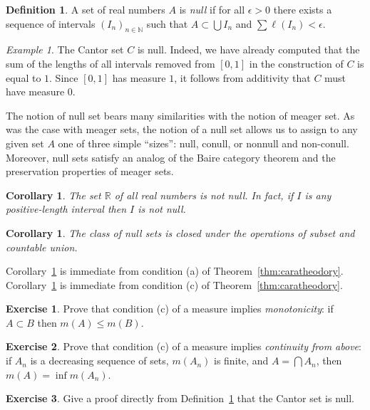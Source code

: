 \documentclass[11pt,oneside]{amsbook}
\newcommand{\NN}{\mathbb N}
\newcommand{\RR}{\mathbb R}
\theoremstyle{definition}
\newtheorem{exerc}{Exercise}[section]
\theoremstyle{plain}
\newtheorem{cor}[thm]{Corollary}
\theoremstyle{definition}
\newtheorem{defn}[thm]{Definition}
\theoremstyle{remark}
\newtheorem{example}[thm]{Example}
\numberwithin{equation}{section}
\numberwithin{figure}{section}
\begin{document}
\begin{defn}
  \label{defn:null}
  A set of real numbers $A$ is \emph{null} if for all $\epsilon>0$ there exists a sequence of intervals $(I_n)_{n\in\NN}$ such that $A\subset\bigcup I_n$ and $\sum\ell(I_n)<\epsilon$.
\end{defn}

\begin{example}
  The Cantor set $C$ is null. Indeed, we have already computed that the sum of the lengths of all intervals removed from $[0,1]$ in the construction of $C$ is equal to $1$. Since $[0,1]$ has measure $1$, it follows from additivity that $C$ must have measure $0$.
\end{example}

The notion of null set bears many similarities with the notion of meager set. As was the case with meager sets, the notion of a null set allows us to assign to any given set $A$ one of three simple ``sizes'': null, conull, or nonnull and non-conull. Moreover, null sets satisfy an analog of the Baire category theorem and the preservation properties of meager sets.

\begin{cor}
  \label{cor:interval-nonnull}
  The set $\RR$ of all real numbers is not null. In fact, if $I$ is any positive-length interval then $I$ is not null.
\end{cor}

\begin{cor}
  \label{cor:null-pres}
  The class of null sets is closed under the operations of subset and countable union.
\end{cor}

Corollary~\ref{cor:interval-nonnull} is immediate from condition (a) of Theorem~\ref{thm:caratheodory}. Corollary~\ref{cor:null-pres} is immediate from condition (c) of Theorem~\ref{thm:caratheodory}.

\begin{exerc}
  Prove that condition (c) of a measure implies \emph{monotonicity}: if $A\subset B$ then $m(A)\leq m(B)$.
\end{exerc}

\begin{exerc}
  \label{exerc:continuity-above}
  Prove that condition (c) of a measure implies \emph{continuity from above}: if $A_n$ is a decreasing sequence of sets, $m(A_n)$ is finite, and $A=\bigcap A_n$, then $m(A)=\inf m(A_n)$.
\end{exerc}

\begin{exerc}
  Give a proof directly from Definition~\ref{defn:null} that the Cantor set is null.
\end{exerc}
\end{document}
